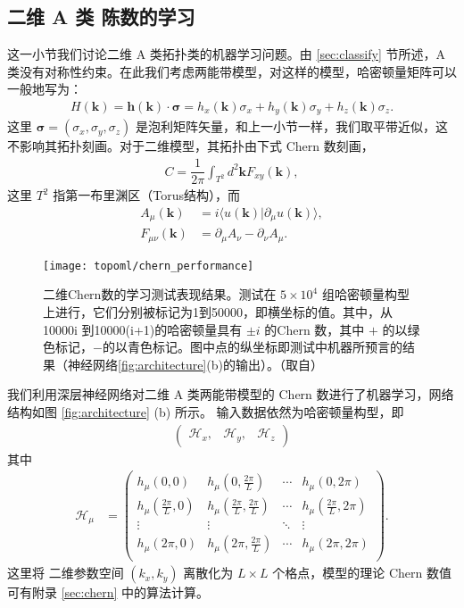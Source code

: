\subsection{二维 A 类 陈数的学习}
这一小节我们讨论二维 A 类拓扑类的机器学习问题。由 \ref{sec:classify} 节所述，A 类没有对称性约束。在此我们考虑两能带模型，对这样的模型，哈密顿量矩阵可以一般地写为：
\begin{align}
    H(\mathbf{k})=\mathbf{h}(\mathbf{k})\cdot\boldsymbol{\sigma}=h_x(\mathbf{k})\sigma_x+h_y(\mathbf{k})\sigma_y+h_z(\mathbf{k})\sigma_z.
\end{align}
这里 $\boldsymbol{\sigma}=(\sigma_x,\sigma_y,\sigma_z)$ 是泡利矩阵矢量，和上一小节一样，我们取平带近似，这不影响其拓扑刻画。对于二维模型，其拓扑由下式 Chern 数刻画，
\begin{align}\label{eq:c1}
    C=\dfrac{1}{2\pi}\int_{T^2}d^2\mathbf{k}F_{xy}(\mathbf{k}), 
\end{align}
这里 $T^2$ 指第一布里渊区（Torus结构），而
\begin{align}%
A_{\mu}(\mathbf{k}) &= i\langle u(\mathbf{k})|\partial_{\mu} u(\mathbf{k})\rangle, \\ 
F_{\mu\nu}(\mathbf{k}) &= \partial_{\mu}A_{\nu}-\partial_{\nu}A_{\mu}.
\end{align}

\begin{figure}[t]
\centering
\texttt{[image: topoml/chern\_performance]}
\caption{二维Chern数的学习测试表现结果。测试在 $5\times10^4$ 组哈密顿量构型上进行，它们分别被标记为1到50000，即横坐标的值。其中，从10000i 到10000(i+1)的哈密顿量具有 $\pm i$ 的Chern 数，其中 $+$ 的以绿色标记，$-$的以青色标记。图中点的纵坐标即测试中机器所预言的结果（神经网络\ref{fig:architecture}(b)的输出）。（取自）}
\label{fig:perf-chern}
\end{figure}


我们利用深层神经网络对二维 A 类两能带模型的 Chern 数进行了机器学习，网络结构如图 \ref{fig:architecture} (b) 所示。
输入数据依然为哈密顿量构型，即 
\begin{align}
\begin{pmatrix}\mathcal{H}_x, & \mathcal{H}_y, & \mathcal{H}_z 
\end{pmatrix}
\end{align}
其中
\begin{align}
\mathcal{H}_{\mu} &=
\begin{pmatrix}
h_{\mu}(0,0) & h_{\mu}(0,\frac{2\pi}{L}) & \cdots & h_{\mu}(0,2\pi) \\
h_{\mu}(\frac{2\pi}{L},0) & h_{\mu}(\frac{2\pi}{L},\frac{2\pi}{L}) & \cdots & h_{\mu}(\frac{2\pi}{L},2\pi) \\
\vdots & \vdots & \ddots & \vdots \\
h_{\mu}(2\pi,0) & h_{\mu}(2\pi,\frac{2\pi}{L}) & \cdots & h_{\mu}(2\pi,2\pi) \\
\end{pmatrix}.
\end{align}
这里将 二维参数空间 $(k_x,k_y)$ 离散化为 $L\times L$ 个格点，模型的理论 Chern 数值可有附录 \ref{sec:chern} 中的算法计算。



